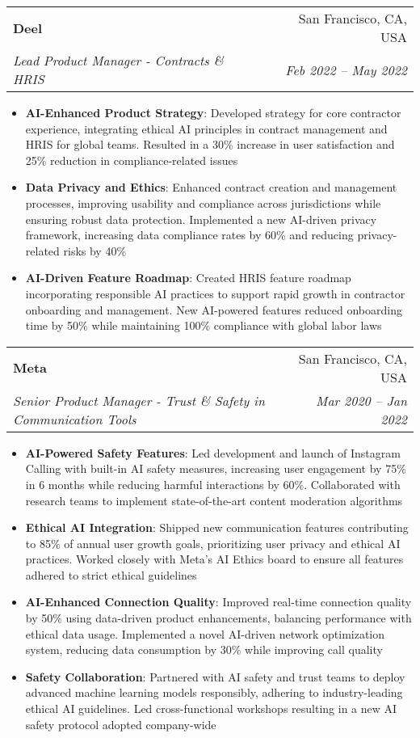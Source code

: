 \documentclass[letterpaper,11pt]{article}
\makeatletter
\newcommand{\resumeItem}[2]{
  \item\small{
    \textbf{#1}{: #2 \vspace{-2pt}}
  }
}
\newcommand{\resumeSubheading}[4]{
  \vspace{-1pt}\item
    \begin{tabular*}{0.97\textwidth}[t]{l@{\extracolsep{\fill}}r}
      \textbf{#1} & #2 \\
      \textit{\small#3} & \textit{\small #4} \\
    \end{tabular*}\vspace{-5pt}
}
\newcommand{\resumeItemListStart}{\begin{itemize}}
\newcommand{\resumeItemListEnd}{\end{itemize}\vspace{-5pt}}
\makeatother
\begin{document}
    \resumeSubheading
      {Deel}{San Francisco, CA, USA}
      {Lead Product Manager - Contracts \& HRIS}{Feb 2022 -- May 2022}
      \resumeItemListStart
        \resumeItem{AI-Enhanced Product Strategy}
          {Developed strategy for core contractor experience, integrating ethical AI principles in contract management and HRIS for global teams. Resulted in a 30\% increase in user satisfaction and 25\% reduction in compliance-related issues}
        \resumeItem{Data Privacy and Ethics}
          {Enhanced contract creation and management processes, improving usability and compliance across jurisdictions while ensuring robust data protection. Implemented a new AI-driven privacy framework, increasing data compliance rates by 60\% and reducing privacy-related risks by 40\%}
        \resumeItem{AI-Driven Feature Roadmap}
          {Created HRIS feature roadmap incorporating responsible AI practices to support rapid growth in contractor onboarding and management. New AI-powered features reduced onboarding time by 50\% while maintaining 100\% compliance with global labor laws}
      \resumeItemListEnd
    
    \resumeSubheading
      {Meta}{San Francisco, CA, USA}
      {Senior Product Manager - Trust \& Safety in Communication Tools}{Mar 2020 -- Jan 2022}
      \resumeItemListStart
        \resumeItem{AI-Powered Safety Features}
          {Led development and launch of Instagram Calling with built-in AI safety measures, increasing user engagement by 75\% in 6 months while reducing harmful interactions by 60\%. Collaborated with research teams to implement state-of-the-art content moderation algorithms}
        \resumeItem{Ethical AI Integration}
          {Shipped new communication features contributing to 85\% of annual user growth goals, prioritizing user privacy and ethical AI practices. Worked closely with Meta's AI Ethics board to ensure all features adhered to strict ethical guidelines}
        \resumeItem{AI-Enhanced Connection Quality}
          {Improved real-time connection quality by 50\% using data-driven product enhancements, balancing performance with ethical data usage. Implemented a novel AI-driven network optimization system, reducing data consumption by 30\% while improving call quality}
        \resumeItem{Safety Collaboration}
          {Partnered with AI safety and trust teams to deploy advanced machine learning models responsibly, adhering to industry-leading ethical AI guidelines. Led cross-functional workshops resulting in a new AI safety protocol adopted company-wide}
      \resumeItemListEnd
\end{document}
